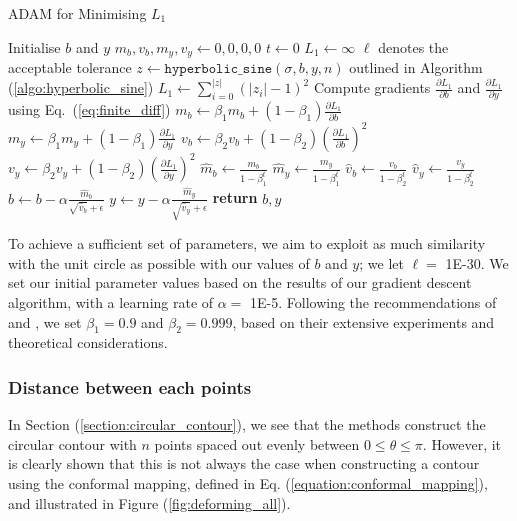 \documentclass[a4paper]{report}
\begin{document}
\begin{algorithm}[H]
\caption{ADAM for Minimising $L_1$}
\label{algo:adam_l1}
\begin{algorithmic}[1]
\State Initialise $b$ and $y$
\State $m_b, v_b, m_y, v_y \gets 0, 0, 0, 0$
\State $t \gets 0$
\State $L_1 \gets \infty$
 \Comment $\ell$ denotes the acceptable tolerance
\State $z \gets \texttt{hyperbolic\_sine}(\sigma, b, y, n)$ \Comment outlined in Algorithm (\ref{algo:hyperbolic_sine})
        \State $L_1 \gets \sum_{i=0}^{|z|} (|z_i| - 1)^2$
\State Compute gradients $\frac{\partial L_1}{\partial b}$ and $\frac{\partial L_1}{\partial y}$ \Comment using Eq.~(\ref{eq:finite_diff})
\State $m_b \gets \beta_1 m_b + (1 - \beta_1) \frac{\partial L_1}{\partial b}$
\State $m_y \gets \beta_1 m_y + (1 - \beta_1) \frac{\partial L_1}{\partial y}$
\State $v_b \gets \beta_2 v_b + (1 - \beta_2) (\frac{\partial L_1}{\partial b})^2$
\State $v_y \gets \beta_2 v_y + (1 - \beta_2) (\frac{\partial L_1}{\partial y})^2$
\State $\hat{m}_b \gets \frac{m_b}{1 - \beta_1^t}$
\State $\hat{m}_y \gets \frac{m_y}{1 - \beta_1^t}$
\State $\hat{v}_b \gets \frac{v_b}{1 - \beta_2^t}$
\State $\hat{v}_y \gets \frac{v_y}{1 - \beta_2^t}$
\State $b \gets b - \alpha \frac{\hat{m}_b}{\sqrt{\hat{v}_b} + \epsilon}$
\State $y \gets y - \alpha \frac{\hat{m}_y}{\sqrt{\hat{v}_y} + \epsilon}$
\EndWhile
\State \textbf{return} $b, y$
\EndProcedure
\end{algorithmic}
\end{algorithm}

To achieve a sufficient set of parameters, we aim to exploit as much similarity with the unit circle as possible with our values of $b$ and $y$; we let $\ell = $ 1E-30. We set our initial parameter values based on the results of our gradient descent algorithm, with a learning rate of $\alpha =$ 1E-5. Following the recommendations of \citet{kingma2014adam} and \citet{goodfellow2016deep}, we set $\beta_1 = 0.9$ and $\beta_2 = 0.999$, based on their extensive experiments and theoretical considerations.
 
\subsubsection{Distance between each points}\label{section:point_distance}
In Section (\ref{section:circular_contour}), we see that the methods construct the circular contour with $n$ points spaced out evenly between $0 \leq \theta \leq \pi$. However, it is clearly shown that this is not always the case when constructing a contour using the conformal mapping, defined in Eq. (\ref{equation:conformal_mapping}), and illustrated in Figure (\ref{fig:deforming_all}).
\end{document}

